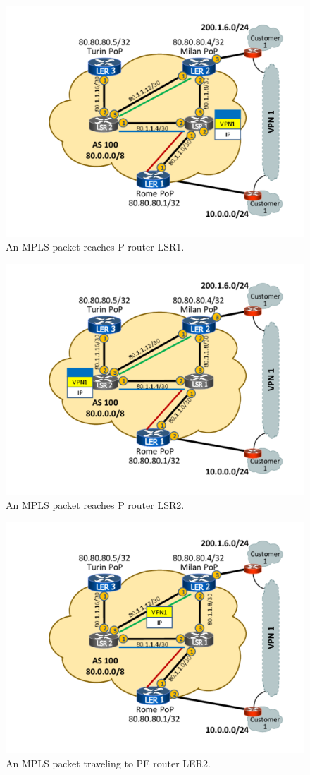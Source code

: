 \documentclass{article}
\begin{document}
\begin{figure}
\centering
 \includegraphics[trim=0cm 1.5cm 0cm 1.5cm, clip=true, width=0.7\columnwidth]{figures/mpls-slides-20}
 \caption{An MPLS packet reaches P router LSR1.}
 \label{fig:mpls-slides-20}
\end{figure}

\begin{figure}
\centering
 \includegraphics[trim=0cm 1.5cm 0cm 1.5cm, clip=true, width=0.7\columnwidth]{figures/mpls-slides-21}
 \caption{An MPLS packet reaches P router LSR2.}
 \label{fig:mpls-slides-21}
\end{figure}

\begin{figure}
\centering
 \includegraphics[trim=0cm 1.5cm 0cm 1.5cm, clip=true, width=0.7\columnwidth]{figures/mpls-slides-22}
 \caption{An MPLS packet traveling to PE router LER2.}
 \label{fig:mpls-slides-22}
\end{figure}
\end{document}
